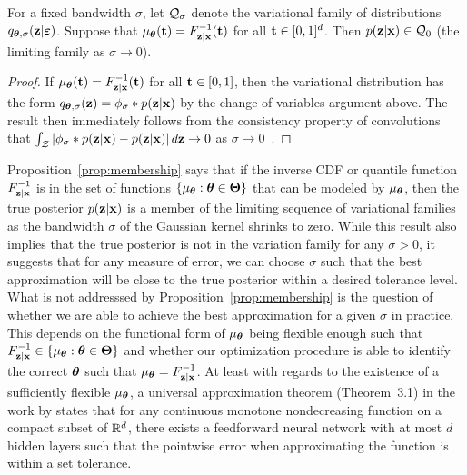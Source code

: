 \documentclass[10pt]{article}
\begin{document}
\begin{proposition} \label{prop:membership}
For a fixed bandwidth $\sigma$, let $\mathcal{Q}_\sigma$ denote the variational family of distributions $q_{{\bm{\theta}},\sigma}(\mathbf{z}|\bm{\varepsilon})$. Suppose that $\mu_{\bm{\theta}}(\mathbf{t})=F_{\mathbf{z}|\mathbf{x}}^{-1}(\mathbf{t})$ for all $\mathbf{t}\in[0,1]^d$. Then $p(\mathbf{z}|\mathbf{x})\in\mathcal{Q}_0$ (the limiting family as $\sigma\rightarrow0$).
\end{proposition}
\begin{proof}
If $\mu_{\bm{\theta}}(\mathbf{t})=F_{\mathbf{z}|\mathbf{x}}^{-1}(\mathbf{t})$ for all $\mathbf{t}\in[0,1]$, then the variational distribution has the form $q_{{\bm{\theta}},\sigma}(\mathbf{z}) = \phi_\sigma*p(\mathbf{z}|\mathbf{x})$ by the change of variables argument above. The result then immediately follows from the consistency property of convolutions that $\int_{\mathcal{Z}}\left|\phi_\sigma*p(\mathbf{z}|\mathbf{x}) - p(\mathbf{z}|\mathbf{x})\right|d\mathbf{z}\rightarrow0$ as $\sigma\rightarrow0$~\citep{Devroye:2001}.
\end{proof}

Proposition~\ref{prop:membership} says that if the inverse CDF or quantile function $F_{\mathbf{z}|\mathbf{x}}^{-1}$ is in the set of functions $\{\mu_{\bm{\theta}}:{\bm{\theta}}\in{\bm\Theta}\}$ that can be modeled by $\mu_{\bm{\theta}}$, then the true posterior $p(\mathbf{z}|\mathbf{x})$ is a member of the limiting sequence of variational families as the bandwidth $\sigma$ of the Gaussian kernel shrinks to zero. While this result also implies that the true posterior is not in the variation family for any $\sigma>0$, it suggests that for any measure of error, we can choose $\sigma$ such that the best approximation will be close to the true posterior within a desired tolerance level.
\\

What is not addresssed by Proposition~\ref{prop:membership} is the question of whether we are able to achieve the best approximation for a given $\sigma$ in practice. This depends on the functional form of $\mu_{\bm{\theta}}$ being flexible enough such that $F_{\mathbf{z}|\mathbf{x}}^{-1}\in\{\mu_{\bm{\theta}}:{\bm{\theta}}\in{\bm\Theta}\}$ and whether our optimization procedure is able to identify the correct ${\bm{\theta}}$ such that $\mu_{\bm{\theta}}=F_{\mathbf{z}|\mathbf{x}}^{-1}$. At least with regards to the existence of a sufficiently flexible $\mu_{\bm{\theta}}$, a universal approximation theorem (Theorem~3.1) in the work by \citet{Daniels:2010} states that for any continuous monotone nondecreasing function on a compact subset of $\mathbb{R}^d$, there exists a feedforward neural network with at most $d$ hidden layers such that the pointwise error when approximating the function is within a set tolerance.
\\
\end{document}
